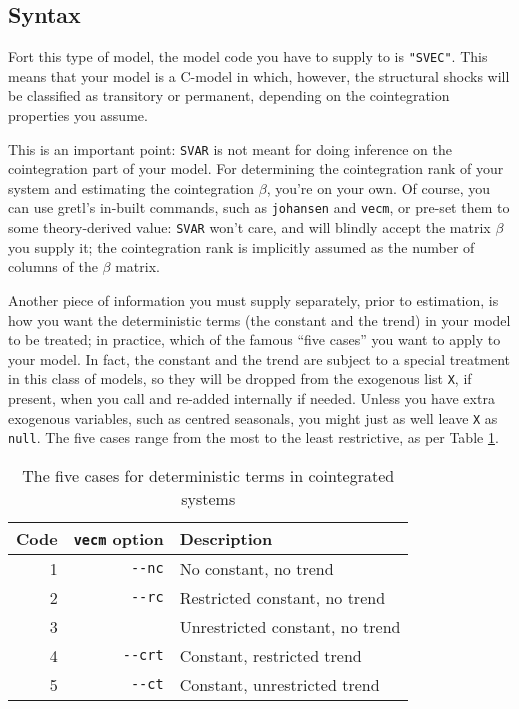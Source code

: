 \documentclass[a4paper,10pt]{article}
\newcommand{\app}[1]{\textsf{#1}}
\newcommand{\cmd}[1]{\texttt{#1}}
\newcommand{\dtk}[1]{\texttt{\detokenize{#1}}}
\newcommand{\option}[1]{\texttt{-{}-#1}}
\newcounter{script}[section]
\begin{document}
\subsection{Syntax}
\label{sec:KPSWsyntax}

Fort this type of model, the model code you have to supply to
\dtk{SVAR_setup} is \cmd{"SVEC"}. This means that your model is a
C-model in which, however, the structural shocks will be classified as
transitory or permanent, depending on the cointegration properties you
assume.

This is an important point: \texttt{SVAR} is not meant for doing
inference on the cointegration part of your model. For determining the
cointegration rank of your system and estimating the cointegration
$\beta$, you're on your own. Of course, you can use \app{gretl}'s
in-built commands, such as \cmd{johansen} and \cmd{vecm}, or pre-set
them to some theory-derived value: \texttt{SVAR} won't care, and will
blindly accept the matrix $\beta$ you supply it; the cointegration
rank is implicitly assumed as the number of columns of the $\beta$
matrix.

Another piece of information you must supply separately, prior to
estimation, is how you want the deterministic terms (the constant and
the trend) in your model to be treated; in practice, which of the
famous ``five cases'' you want to apply to your model. In fact, the
constant and the trend are subject to a special treatment in this
class of models, so they will be dropped from the exogenous list
\texttt{X}, if present, when you call \dtk{SVAR_setup} and re-added
internally if needed. Unless you have extra exogenous variables, such
as centred seasonals, you might just as well leave \texttt{X} as
\texttt{null}. The five cases range from the most to the least
restrictive, as per Table \ref{tab:5cases}.

\begin{table}[htbp]
  \centering
  \begin{tabular}{rrl}
    \hline
    Code & \cmd{vecm} option & Description\\
    \hline
    1 & \option{nc} & No constant, no trend \\
    2 & \option{rc} & Restricted constant, no trend \\
    3 &  & Unrestricted constant, no trend \\
    4 & \option{crt} & Constant, restricted trend \\
    5 & \option{ct} & Constant, unrestricted trend \\
    \hline
  \end{tabular}
  \caption{The five cases for deterministic terms in cointegrated systems}
  \label{tab:5cases}
\end{table}
\end{document}
